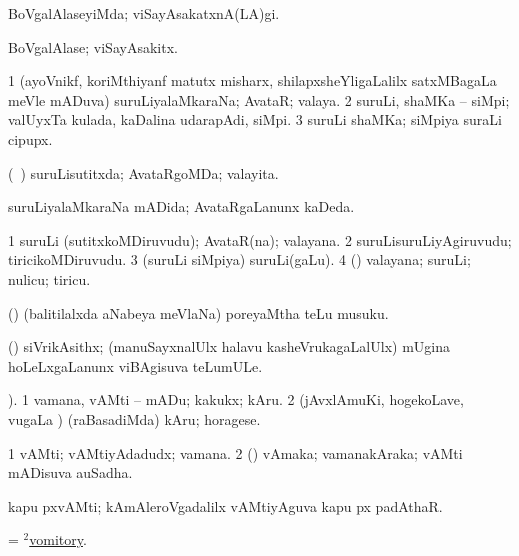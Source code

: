 \bentry 
{} 
\gl{\kirxvi}
\expl{}
\bmng
 BoVgalAlaseyiMda; viSayAsakatxnA(LA)gi. 
\emng
\eentry

\bentry 
{} 
\gl{\nA}
\expl{}
\bmng
 BoVgalAlase; viSayAsakitx. 
\emng
\eentry

\bentry
{} 
\gl{\nA}
\expl{}
\bmng
\bnum
\num{1} (ayoVnikf, koriMthiyanf matutx misharx, shilapxsheYligaLalilx satxMBagaLa meVle mADuva) suruLiyalaMkaraNa; AvataR; valaya. 
\num{2} suruLi, shaMKa -- siMpi; valUyxTa kulada, kaDalina udarapAdi, siMpi. 
\num{3} suruLi shaMKa; siMpiya suraLi cipupx. 
\enum
\emng
\eentry

\bentry
{} 
\gl{\gu}
\expl{}
\bmng
 (\kanmu\ \savi) suruLisutitxda; AvataRgoMDa; valayita. 
\emng
\eentry

\bentry 
{} 
\gl{\gu}
\expl{}
\bmng
suruLiyalaMkaraNa mADida; AvataRgaLanunx kaDeda. 
\emng
\eentry

\bentry 
{} 
\gl{\nA}
\expl{}
\bmng
\bnum
\num{1} suruLi (sutitxkoMDiruvudu); AvataR(na); valayana. 
\num{2} suruLisuruLiyAgiruvudu; tiricikoMDiruvudu. 
\num{3} (suruLi siMpiya) suruLi(gaLu). 
\num{4} (\aMrashA) valayana; suruLi; nulicu; tiricu. 
\enum
\emng
\eentry

\bentry 
{} 
\gl{\nA}
\expl{}
\bmng
 (\savi) (balitilalxda aNabeya meVlaNa) poreyaMtha teLu musuku. 
\emng
\eentry

\bentry 
{} 
\gl{\nA}
\expl{}
\bmng
 (\aMrashA) siVrikAsithx; (manuSayxnalUlx halavu kasheVrukagaLalUlx) mUgina hoLeLxgaLanunx viBAgisuva teLumULe. 
\emng
\eentry

\bentry
{} 
\gl{\sakirx}
). \bmng
\bnum
\num{1} vamana, vAMti -- mADu; kakukx; kAru. 
\num{2} (jAvxlAmuKi, hogekoLave, \mo vugaLa \vi) (raBasadiMda) kAru; horagese. 
\enum
\emng
\eentry

\bentry 
{} 
\gl{\nA}
\expl{}
\bmng
\bnum
\num{1} vAMti; vAMtiyAdadudx; vamana. 
\num{2} (\pArxparx) vAmaka; vamanakAraka; vAMti mADisuva auSadha. 
\enum
\emng

\noindent 
\gl{\pagu}
\expl{}
\bmng
  kapu pxvAMti; kAmAleroVgadalilx vAMtiyAguva kapu px padAthaR. 
\emng
\eentry

\bentry
{} 
\gl{\nA}
\bmng
 = \hyperlink{vomitory(2)}{$^2$vomitory}. 
\emng
\eentry

